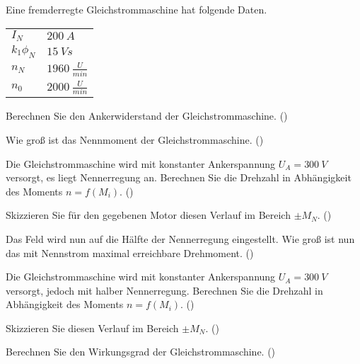 \begin{question}[section=2,name={24.7.2013},mode=exm,type=bsp,tags={20130724}]
Eine fremderregte Gleichstrommaschine hat folgende Daten.\\
\begin{tabular}{L{2cm}l}
$I_{N}$ \dotfill &$200~A$\\
$k_1 \phi_N$ \dotfill & $15~Vs$ \\
$n_N$ \dotfill & $1960~\frac{U}{min}$\\
$n_0$ \dotfill & $2000~\frac{U}{min}$
\end{tabular}
\begin{compactenum}
\item Berechnen Sie den Ankerwiderstand der Gleichstrommaschine. ()
\item Wie groß ist das Nennmoment der Gleichstrommaschine. ()
\item Die Gleichstrommaschine wird mit konstanter Ankerspannung $U_A = 300~V$ versorgt, es liegt Nennerregung an. Berechnen Sie die Drehzahl in Abhängigkeit des Moments $n=f(M_i)$. ()
\item Skizzieren Sie für den gegebenen Motor diesen Verlauf im Bereich $\pm M_N$. ()
\item Das Feld wird nun auf die Hälfte der Nennerregung eingestellt. Wie groß ist nun das mit Nennstrom maximal erreichbare Drehmoment. ()
\item Die Gleichstrommaschine wird mit konstanter Ankerspannung $U_A = 300~V$ versorgt, jedoch mit halber Nennerregung. Berechnen Sie die Drehzahl in Abhängigkeit des Moments $n=f(M_i)$. ()
\item Skizzieren Sie diesen Verlauf im Bereich $\pm M_N$. ()
\item Berechnen Sie den Wirkungsgrad der Gleichstrommaschine. ()
\end{compactenum}
\end{question}
